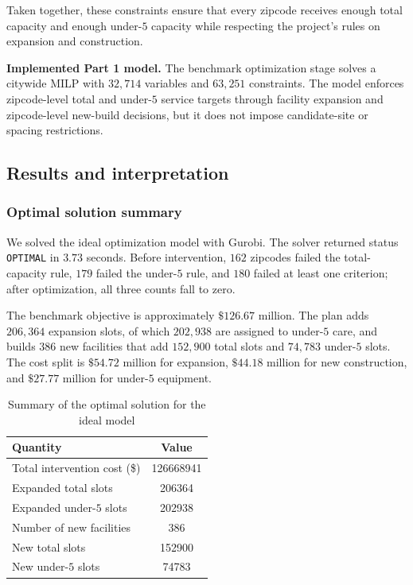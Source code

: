 \documentclass[11pt]{article}
\newcommand{\1}{\mathbb{I}}
\begin{document}
Taken together, these constraints ensure that every zipcode receives enough total capacity and enough under-\(5\) capacity while respecting the project’s rules on expansion and construction.

\begin{resultbox}
\textbf{Implemented Part 1 model.}
The benchmark optimization stage solves a citywide MILP with \(32{,}714\) variables and \(63{,}251\) constraints. The model enforces zipcode-level total and under-\(5\) service targets through facility expansion and zipcode-level new-build decisions, but it does not impose candidate-site or spacing restrictions.
\end{resultbox}

\subsection{Results and interpretation}

\subsubsection{Optimal solution summary}

We solved the ideal optimization model with Gurobi. The solver returned status \texttt{OPTIMAL} in \(3.73\) seconds. Before intervention, \(162\) zipcodes failed the total-capacity rule, \(179\) failed the under-\(5\) rule, and \(180\) failed at least one criterion; after optimization, all three counts fall to zero.

The benchmark objective is approximately \(\$126.67\) million. The plan adds \(206{,}364\) expansion slots, of which \(202{,}938\) are assigned to under-\(5\) care, and builds \(386\) new facilities that add \(152{,}900\) total slots and \(74{,}783\) under-\(5\) slots. The cost split is \(\$54.72\) million for expansion, \(\$44.18\) million for new construction, and \(\$27.77\) million for under-\(5\) equipment.

\begin{table}[H]
\centering
\small
\begin{tabular}{lS[table-format=9.0]}
\toprule
\textbf{Quantity} & {\textbf{Value}} \\
\midrule
Total intervention cost (\$) & 126668941 \\
Expanded total slots & 206364 \\
Expanded under-\(5\) slots & 202938 \\
Number of new facilities & 386 \\
New total slots & 152900 \\
New under-\(5\) slots & 74783 \\
\bottomrule
\end{tabular}
\caption{Summary of the optimal solution for the ideal model}
\end{table}
\end{document}
